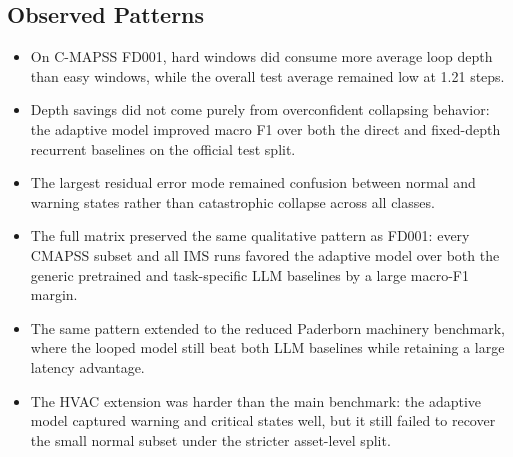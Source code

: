 \subsection{Observed Patterns}
\begin{itemize}
    \item On C-MAPSS FD001, hard windows did consume more average loop depth than easy windows, while the overall test average remained low at 1.21 steps.
    \item Depth savings did not come purely from overconfident collapsing behavior: the adaptive model improved macro F1 over both the direct and fixed-depth recurrent baselines on the official test split.
    \item The largest residual error mode remained confusion between normal and warning states rather than catastrophic collapse across all classes.
    \item The full matrix preserved the same qualitative pattern as FD001: every CMAPSS subset and all IMS runs favored the adaptive model over both the generic pretrained and task-specific LLM baselines by a large macro-F1 margin.
    \item The same pattern extended to the reduced Paderborn machinery benchmark, where the looped model still beat both LLM baselines while retaining a large latency advantage.
    \item The HVAC extension was harder than the main benchmark: the adaptive model captured warning and critical states well, but it still failed to recover the small normal subset under the stricter asset-level split.
\end{itemize}

